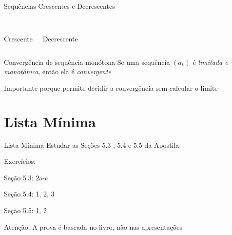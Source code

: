 \begin{frame}{Sequências Crescentes e Decrescentes}
  \begin{columns}
    \begin{center}
      \scalebox{0.9}{} \\[5mm]
      Crescente
    \end{center}
    \pause
    \begin{center}
      \scalebox{0.9}{} \\[5mm]
      Decrescente
    \end{center}
  \end{columns}
\end{frame}

\begin{frame}{Convergência de sequência monótona}
	Se uma sequência $(a_k)$ é \emph{limitada e monotônica},
  então ela é \emph{convergente}

	\pause
	\vspace{2\baselineskip}
	Importante porque permite decidir a convergência sem calcular o limite
\end{frame}

\section{Lista Mínima}

\begin{frame}{Lista Mínima}
  Estudar as Seções 5.3 , 5.4 e 5.5 da Apostila

  \vfill
  Exercícios:

  \quad Seção 5.3: 2a-c

  \quad Seção 5.4: 1, 2, 3

  \quad Seção 5.5: 1, 2

  \vfill
  Atenção: A prova é baseada no livro, não nas apresentações
\end{frame}


